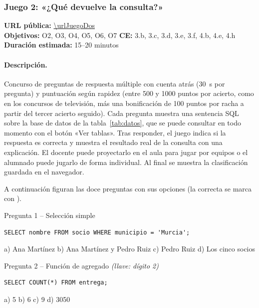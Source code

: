 \documentclass[11pt,a4paper]{article}
\begin{document}
\subsubsection{Juego 2: «¿Qué devuelve la consulta?»}

\begin{nota}
\textbf{URL pública:} \url{\urlJuegoDos}\\
\textbf{Objetivos:} O2, O3, O4, O5, O6, O7 \quad
\textbf{CE:} 3.b, 3.c, 3.d, 3.e, 3.f, 4.b, 4.e, 4.h \quad
\textbf{Duración estimada:} 15–20 minutos
\end{nota}

\paragraph{Descripción.} Concurso de preguntas de respuesta múltiple con cuenta atrás
(30~s por pregunta) y puntuación según rapidez (entre 500 y 1000 puntos por acierto, como en
los concursos de televisión, más una bonificación de 100 puntos por racha a partir del tercer
acierto seguido). Cada pregunta muestra una sentencia SQL sobre la base de datos de la
tabla~\ref{tab:datos}, que se puede consultar en todo momento con el botón «Ver tablas». Tras
responder, el juego indica si la respuesta es correcta y muestra el resultado real de la
consulta con una explicación. El docente puede proyectarlo en el aula para jugar por equipos
o el alumnado puede jugarlo de forma individual. Al final se muestra la clasificación
guardada en el navegador.

A continuación figuran las doce preguntas con sus opciones (la correcta se marca con
\textbf{\checkmark}).

\newcommand{\ok}{\textbf{\checkmark}}

\begin{reto}{Pregunta 1 -- Selección simple}
\begin{lstlisting}
SELECT nombre FROM socio WHERE municipio = 'Murcia';
\end{lstlisting}
a) Ana Martínez \quad
b) Ana Martínez y Pedro Ruiz \ok \quad
c) Pedro Ruiz \quad
d) Los cinco socios
\end{reto}

\begin{reto}{Pregunta 2 -- Función de agregado \emph{(llave: dígito 2)}}
\begin{lstlisting}
SELECT COUNT(*) FROM entrega;
\end{lstlisting}
a) 5 \quad b) 6 \quad c) 9 \ok \quad d) 3050
\end{reto}
\end{document}

